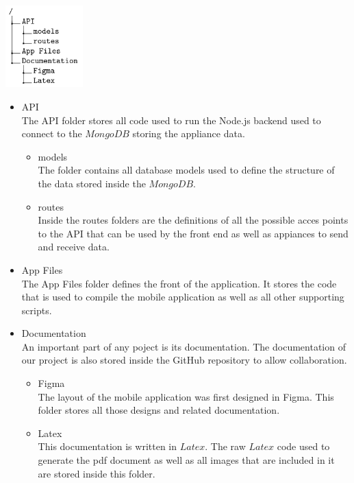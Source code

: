 \documentclass[10pt]{article}
\begin{document}
\begin{multicols*}{2}
\begin{enumerate}
  \begin{center}
    \includegraphics[max width=3cm]{repoTree}
  \end{center}

  \begin{itemize}
    \item {API} \\
    The API folder stores all code used to run the Node.js backend used to connect to the $MongoDB$ storing the appliance data.
    \begin{itemize}
      \item {models} \\
      The folder contains all database models used to define the structure of the data stored inside the $MongoDB$.
      \item {routes} \\
      Inside the routes folders are the definitions of all the possible acces points to the API that can be used by the front end as well as appiances to send and receive data.
    \end{itemize}
    \item {App Files} \\
    The App Files folder defines the front of the application. It stores the code that is used to compile the mobile application as well as all other supporting scripts.
    \item {Documentation} \\
    An important part of any poject is its documentation. The documentation of our project is also stored inside the GitHub repository to allow collaboration.
    \begin{itemize}
      \item {Figma} \\
      The layout of the mobile application was first designed in Figma. This folder stores all those designs and related documentation.
      \item {Latex} \\
      This documentation is written in $Latex$. The raw $Latex$ code used to generate the pdf document as well as all images that are included in it are stored inside this folder.
    \end{itemize}
  \end{itemize}


\end{enumerate}
\end{multicols*}
\end{document}
